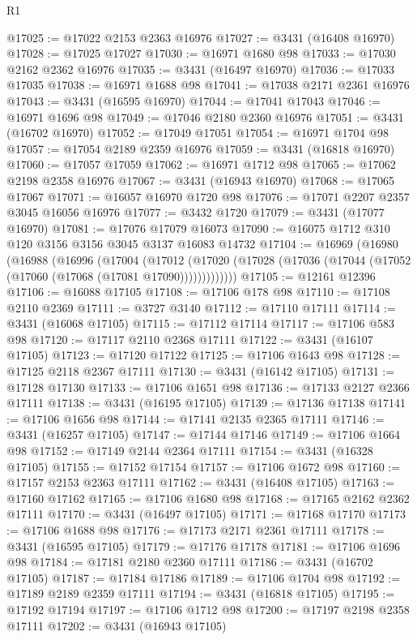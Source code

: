 \begin{lexlean}{R1}
\begin{coremodule}
@17025 := @17022 @2153 @2363 @16976
@17027 := @3431 (@16408 @16970)
@17028 := @17025 @17027
@17030 := @16971 @1680 @98
@17033 := @17030 @2162 @2362 @16976
@17035 := @3431 (@16497 @16970)
@17036 := @17033 @17035
@17038 := @16971 @1688 @98
@17041 := @17038 @2171 @2361 @16976
@17043 := @3431 (@16595 @16970)
@17044 := @17041 @17043
@17046 := @16971 @1696 @98
@17049 := @17046 @2180 @2360 @16976
@17051 := @3431 (@16702 @16970)
@17052 := @17049 @17051
@17054 := @16971 @1704 @98
@17057 := @17054 @2189 @2359 @16976
@17059 := @3431 (@16818 @16970)
@17060 := @17057 @17059
@17062 := @16971 @1712 @98
@17065 := @17062 @2198 @2358 @16976
@17067 := @3431 (@16943 @16970)
@17068 := @17065 @17067
@17071 := @16057 @16970 @1720 @98
@17076 := @17071 @2207 @2357 @3045 @16056 @16976
@17077 := @3432 @1720
@17079 := @3431 (@17077 @16970)
@17081 := @17076 @17079 @16073
@17090 := @16075 @1712 @310 @120 @3156 @3156 @3045 @3137 @16083 @14732
@17104 := @16969
    (@16980
      (@16988
        (@16996
          (@17004
            (@17012
              (@17020 (@17028 (@17036 (@17044 (@17052 (@17060 (@17068 (@17081 @17090)))))))))))))
@17105 := @12161 @12396
@17106 := @16088 @17105
@17108 := @17106 @178 @98
@17110 := @17108 @2110 @2369
@17111 := @3727 @3140
@17112 := @17110 @17111
@17114 := @3431 (@16068 @17105)
@17115 := @17112 @17114
@17117 := @17106 @583 @98
@17120 := @17117 @2110 @2368 @17111
@17122 := @3431 (@16107 @17105)
@17123 := @17120 @17122
@17125 := @17106 @1643 @98
@17128 := @17125 @2118 @2367 @17111
@17130 := @3431 (@16142 @17105)
@17131 := @17128 @17130
@17133 := @17106 @1651 @98
@17136 := @17133 @2127 @2366 @17111
@17138 := @3431 (@16195 @17105)
@17139 := @17136 @17138
@17141 := @17106 @1656 @98
@17144 := @17141 @2135 @2365 @17111
@17146 := @3431 (@16257 @17105)
@17147 := @17144 @17146
@17149 := @17106 @1664 @98
@17152 := @17149 @2144 @2364 @17111
@17154 := @3431 (@16328 @17105)
@17155 := @17152 @17154
@17157 := @17106 @1672 @98
@17160 := @17157 @2153 @2363 @17111
@17162 := @3431 (@16408 @17105)
@17163 := @17160 @17162
@17165 := @17106 @1680 @98
@17168 := @17165 @2162 @2362 @17111
@17170 := @3431 (@16497 @17105)
@17171 := @17168 @17170
@17173 := @17106 @1688 @98
@17176 := @17173 @2171 @2361 @17111
@17178 := @3431 (@16595 @17105)
@17179 := @17176 @17178
@17181 := @17106 @1696 @98
@17184 := @17181 @2180 @2360 @17111
@17186 := @3431 (@16702 @17105)
@17187 := @17184 @17186
@17189 := @17106 @1704 @98
@17192 := @17189 @2189 @2359 @17111
@17194 := @3431 (@16818 @17105)
@17195 := @17192 @17194
@17197 := @17106 @1712 @98
@17200 := @17197 @2198 @2358 @17111
@17202 := @3431 (@16943 @17105)

\end{coremodule}
\end{lexlean}
